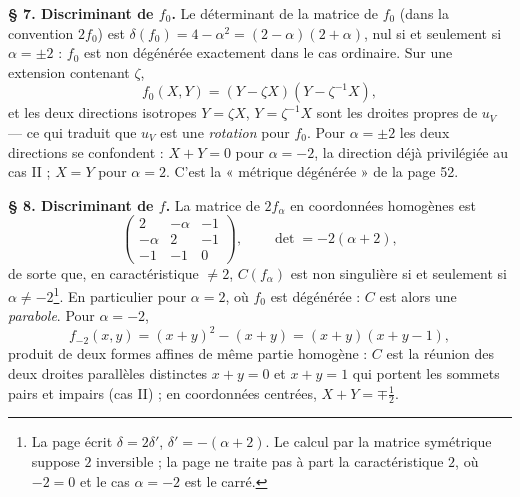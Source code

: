 \documentclass[11pt,a4paper]{article}
\begin{document}
\textbf{§ 7. Discriminant de $f_0$.} Le déterminant de la matrice de $f_0$
(dans la convention $2 f_0$) est $\delta(f_0) = 4 - \alpha^2 = (2 - \alpha)(2
+ \alpha)$, nul si et seulement si $\alpha = \pm 2$ : $f_0$ est non dégénérée
exactement dans le cas ordinaire. Sur une extension contenant $\zeta$,
\[
  f_0(X, Y) = (Y - \zeta X)(Y - \zeta^{-1} X) ,
\]
et les deux directions isotropes $Y = \zeta X$, $Y = \zeta^{-1} X$ sont les
droites propres de $u_V$ --- ce qui traduit que $u_V$ est une
\emph{rotation} pour $f_0$. Pour $\alpha = \pm 2$ les deux directions se
confondent : $X + Y = 0$ pour $\alpha = -2$, la direction déjà privilégiée au
cas II ; $X = Y$ pour $\alpha = 2$. C'est la « métrique dégénérée » de la
page 52.

\textbf{§ 8. Discriminant de $f$.} La matrice de $2 f_\alpha$ en coordonnées
homogènes est
\[
  \begin{pmatrix} 2 & -\alpha & -1 \\ -\alpha & 2 & -1 \\ -1 & -1 & 0
  \end{pmatrix}, \qquad \det = -2(\alpha + 2) ,
\]
de sorte que, en caractéristique $\neq 2$, $C(f_\alpha)$ est non singulière si
et seulement si $\alpha \neq -2$\footnote{La page écrit $\delta = 2\delta'$,
$\delta' = -(\alpha + 2)$. Le calcul par la matrice symétrique suppose $2$
inversible ; la page ne traite pas à part la caractéristique $2$, où $-2 = 0$
et le cas $\alpha = -2$ est le carré.}. En particulier pour $\alpha = 2$, où
$f_0$ est dégénérée : $C$ est alors une \emph{parabole}. Pour $\alpha = -2$,
\[
  f_{-2}(x, y) = (x + y)^2 - (x + y) = (x + y)(x + y - 1) ,
\]
produit de deux formes affines de même partie homogène : $C$ est la réunion
des deux droites parallèles distinctes $x + y = 0$ et $x + y = 1$ qui portent
les sommets pairs et impairs (cas II) ; en coordonnées centrées, $X + Y = \mp
\frac12$.
\end{document}
